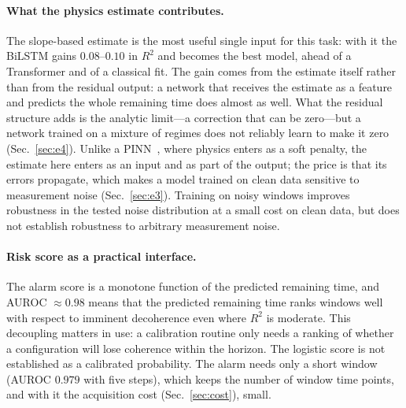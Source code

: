 \documentclass[twocolumn,10pt]{article}
\begin{document}
\paragraph{What the physics estimate contributes.}
The slope-based estimate is the most useful single input for this task:
with it the BiLSTM gains $0.08$--$0.10$ in $R^2$ and becomes the best
model, ahead of a Transformer and of a classical fit. The gain comes from
the estimate itself rather than from the residual output: a network that
receives the estimate as a feature and predicts the whole remaining time
does almost as well. What the residual structure adds is the analytic
limit---a correction that can be zero---but a network trained on a mixture
of regimes does not reliably learn to make it zero (Sec.~\ref{sec:e4}).
Unlike a PINN~\cite{Raissi2019}, where physics enters as a soft penalty,
the estimate here enters as an input and as part of the output; the
price is that its errors propagate, which makes a model trained on clean
data sensitive to measurement noise (Sec.~\ref{sec:e3}). Training on noisy
windows improves robustness in the tested noise distribution at a small cost
on clean data, but does not establish robustness to arbitrary measurement noise.

\paragraph{Risk score as a practical interface.}
The alarm score is a monotone function of the predicted remaining time,
and AUROC $\approx 0.98$ means that the predicted remaining time ranks
windows well with respect to imminent decoherence even where $R^2$ is
moderate.
This decoupling matters in use: a calibration routine only needs a
ranking of whether a configuration will lose coherence within the horizon.
The logistic score is not established as a calibrated probability.
The alarm needs only a short window (AUROC $0.979$ with five steps),
which keeps the number of window time points, and with it the acquisition
cost (Sec.~\ref{sec:cost}), small.
\end{document}
